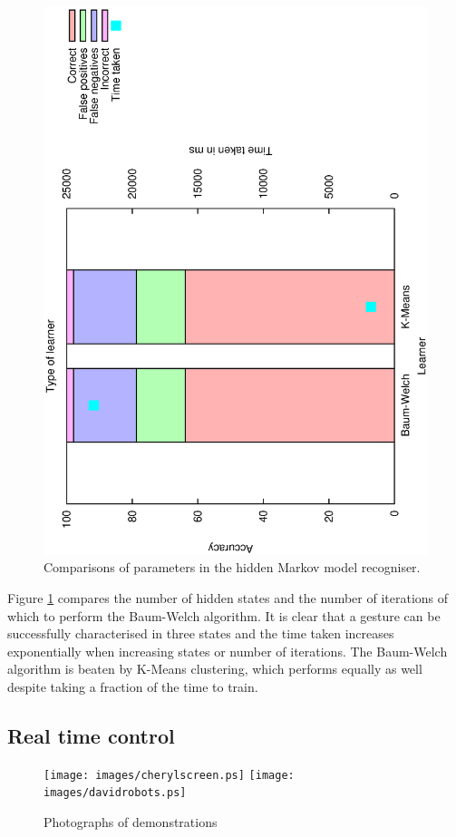 \documentclass[12pt,a4,notitlepage]{report}
\renewcommand{\_}{\texttt{\symbol{95}}}
\newcommand{\<}{\texttt{\symbol{60}}}
\renewcommand{\>}{\texttt{\symbol{62}}}
\begin{document}
\begin{figure}
\includegraphics[scale=0.4,angle=-90]{results/markov/m_learner.ps}
\caption{Comparisons of parameters in the hidden Markov model recogniser.}
\label{m_parameters}
\end{figure}

Figure \ref{m_parameters} compares the number of hidden states and the number of iterations of which to perform the Baum-Welch algorithm. It is clear that a gesture can be successfully characterised in three states and the time taken increases exponentially when increasing states or number of iterations. The Baum-Welch algorithm is beaten by K-Means clustering, which performs equally as well despite taking a fraction of the time to train.

\subsection{Real time control}
\begin{figure}
\centering
\texttt{[image: images/cherylscreen.ps]}
\texttt{[image: images/davidrobots.ps]}
\caption{Photographs of demonstrations}
\label{demonstrations}
\end{figure}
\end{document}
